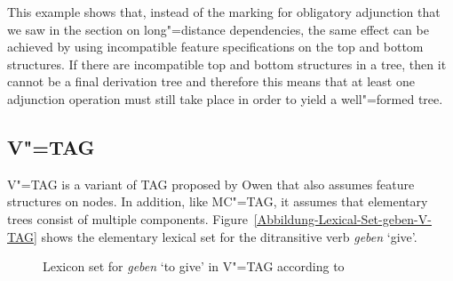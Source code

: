 This example shows that, instead of the marking for obligatory adjunction that we saw in the section on long"=distance
dependencies, the same effect can be achieved by using incompatible feature specifications on the top and bottom structures.
If there are incompatible top and bottom structures in a tree, then it cannot be a final derivation
tree and therefore this means that at least one adjunction operation must still take place in order
to yield a well"=formed tree.

\subsection{V"=TAG}
\label{sec-vtag}

\largerpage
V"=TAG 
is a variant of TAG proposed by Owen \citet{Rambow94a} that also assumes feature structures on
nodes. In addition, like MC"=TAG, it assumes that elementary trees consist of multiple components. Figure~\vref{Abbildung-Lexical-Set-geben-V-TAG} shows the elementary lexical set
for the ditransitive verb \emph{geben} `give'.
\begin{figure}
\vspace{4\baselineskip}
\vspace{.4\baselineskip}
\caption{\label{Abbildung-Lexical-Set-geben-V-TAG}Lexicon set for \emph{geben} `to give' in V"=TAG
  according to \citet[]{Rambow94a}}
\end{figure}%
